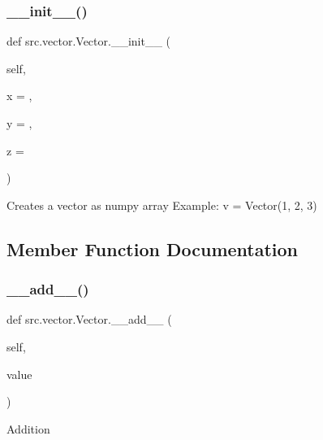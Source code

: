 \subsubsection{\texorpdfstring{\+\_\+\+\_\+init\+\_\+\+\_\+()}{\_\_init\_\_()}}
{\footnotesize\ttfamily def src.\+vector.\+Vector.\+\_\+\+\_\+init\+\_\+\+\_\+ (\begin{DoxyParamCaption}\item[{}]{self,  }\item[{}]{x = {},  }\item[{}]{y = {},  }\item[{}]{z = {} }\end{DoxyParamCaption})}

\begin{DoxyVerb}Creates a vector as numpy array
Example: v = Vector(1, 2, 3)
\end{DoxyVerb}
 

\subsection{Member Function Documentation}
\mbox{\label{classsrc_1_1vector_1_1Vector_a358bc9e03ceee15962541fd1f21685c1}} 
\subsubsection{\texorpdfstring{\+\_\+\+\_\+add\+\_\+\+\_\+()}{\_\_add\_\_()}}
{\footnotesize\ttfamily def src.\+vector.\+Vector.\+\_\+\+\_\+add\+\_\+\+\_\+ (\begin{DoxyParamCaption}\item[{}]{self,  }\item[{}]{value }\end{DoxyParamCaption})}

\begin{DoxyVerb}Addition\end{DoxyVerb}
 \mbox{\label{classsrc_1_1vector_1_1Vector_abab8effde8519377951a7076e14336ea}} 
